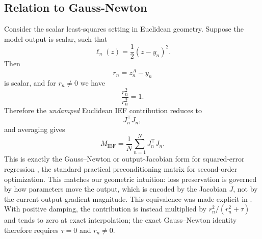 \subsection{Relation to Gauss-Newton}

Consider the scalar least-squares setting in Euclidean geometry. Suppose the model output is scalar, such that
\[
\ell_n(z)=\frac12(z-y_n)^2.
\]
Then
\[
r_n=z_n^A-y_n
\]
is scalar, and for $r_n\neq 0$ we have
\[
\frac{r_n^2}{r_n^2}=1.
\]
Therefore the \emph{undamped} Euclidean IEF contribution reduces to
\[
J_n^\top J_n,
\]
and averaging gives
\[
M_{\mathrm{IEF}}
=
\frac{1}{N}\sum_{n=1}^N J_n^\top J_n.
\]
This is exactly the Gauss--Newton or output-Jacobian form for squared-error regression \citep{GaussNewton,MartensHF,MartensNG}, the standard practical preconditioning matrix for second-order optimization. This matches our geometric intuition: loss preservation is governed by how parameters move the output, which is encoded by the Jacobian $J$, not by the current output-gradient magnitude. This equivalence was made explicit in \citep{IEF}. With positive damping, the contribution is instead multiplied by $r_n^2/(r_n^2+\tau)$ and tends to zero at exact interpolation; the exact Gauss--Newton identity therefore requires $\tau=0$ and $r_n\ne0$.
